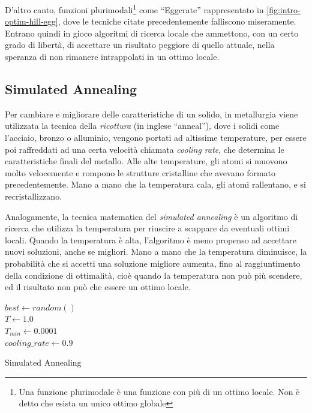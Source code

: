 D'altro canto, funzioni plurimodali\footnote{Una funzione plurimodale è una funzione con più di un ottimo locale. Non è detto che esista un unico ottimo globale} come ``Eggcrate'' rappresentato in \autoref{fig:intro-optim-hill-egg}, dove le tecniche citate precedentemente falliscono miseramente. Entrano quindi in gioco algoritmi di ricerca locale che ammettono, con un certo grado di libertà, di accettare un risultato peggiore di quello attuale, nella speranza di non rimanere intrappolati in un ottimo locale.

\subsection{Simulated Annealing}
\label{chap:intro-optim-sa}
Per cambiare e migliorare delle caratteristiche di un solido, in metallurgia viene utilizzata la tecnica della \textit{ricottura} (in inglese ``anneal''), dove i solidi come l'acciaio, bronzo o alluminio, vengono portati ad altissime temperature, per essere poi raffreddati ad una certa velocità chiamata \textit{cooling rate}, che determina le caratteristiche finali del metallo. Alle alte temperature, gli atomi si muovono molto velocemente e rompono le strutture cristalline che avevano formato precedentemente. Mano a mano che la temperatura cala, gli atomi rallentano, e si recristallizzano.

Analogamente, la tecnica matematica del \textit{simulated annealing} è un algoritmo di ricerca che utilizza la temperatura per riuscire a scappare da eventuali ottimi locali. Quando la temperatura è alta, l'algoritmo è meno propenso ad accettare nuovi soluzioni, anche se migliori. Mano a mano che la temperatura diminuisce, la probabilità che si accetti una soluzione migliore aumenta, fino al raggiuntimento della condizione di ottimalità, cioè quando la temperatura non può più scendere, ed il risultato non può che essere un ottimo locale.

\begin{algorithm}[h]
    $best \gets random()$ \\
    $T \gets 1.0$ \\
    $T_{min} \gets 0.0001$ \\
    $cooling\_rate \gets 0.9$ \\
    \label{algo:simulated-annealing}
    \caption{Simulated Annealing}
\end{algorithm}

